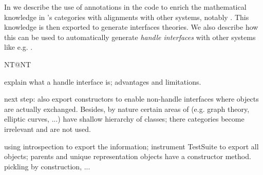 In \cite{DehKohKon:iop16} we describe the use of annotations in the code to enrich the
mathematical knowledge in \Sage's categories with alignments with other systems, notably
\MMT. This knowledge is then exported to generate interfaces theories. We also describe how
this can be used to automatically generate \emph{handle interfaces} with other systems
like e.g. \GAP.
\begin{todolist}{NT@NT}
\item explain what a handle interface is; advantages and limitations.
\item next step: also export constructors to enable non-handle interfaces where objects
  are actually exchanged. Besides, by nature certain areas of \Sage (e.g. graph theory,
  elliptic curves, ...) have shallow hierarchy of classes; there categories become
  irrelevant and are not used. 
\item using introspection to export the information; instrument TestSuite to export all
  objects; parents and unique representation objects have a constructor method. pickling
  by construction, ...
\end{todolist}

